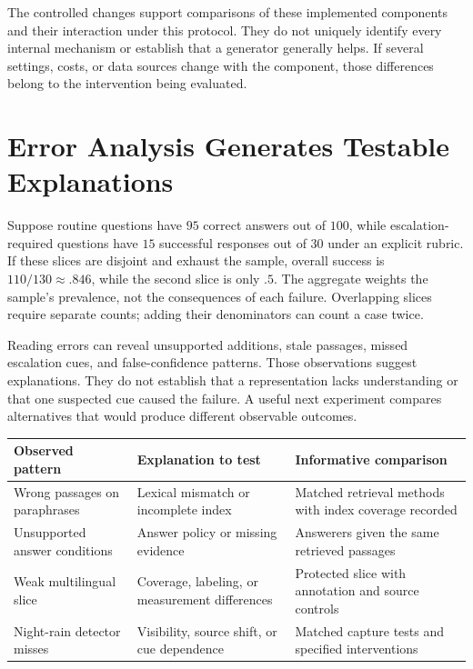 The controlled changes support comparisons of these implemented components and their interaction under this protocol. They do not uniquely identify every internal mechanism or establish that a generator generally helps. If several settings, costs, or data sources change with the component, those differences belong to the intervention being evaluated.

\section{Error Analysis Generates Testable Explanations}

Suppose routine questions have $95$ correct answers out of $100$, while escalation-required questions have $15$ successful responses out of $30$ under an explicit rubric. If these slices are disjoint and exhaust the sample, overall success is $110/130\approx.846$, while the second slice is only $.5$. The aggregate weights the sample's prevalence, not the consequences of each failure. Overlapping slices require separate counts; adding their denominators can count a case twice.

Reading errors can reveal unsupported additions, stale passages, missed escalation cues, and false-confidence patterns. Those observations suggest explanations. They do not establish that a representation lacks understanding or that one suspected cue caused the failure. A useful next experiment compares alternatives that would produce different observable outcomes.

\par\addvspace{\intextsep}\noindent\begin{minipage}{\linewidth}
\centering\small
\begin{tabular}{@{}L{3.0cm}L{3.2cm}L{3.5cm}@{}}
\toprule
Observed pattern & Explanation to test & Informative comparison \\
\midrule
Wrong passages on paraphrases & Lexical mismatch or incomplete index & Matched retrieval methods with index coverage recorded \\
Unsupported answer conditions & Answer policy or missing evidence & Answerers given the same retrieved passages \\
Weak multilingual slice & Coverage, labeling, or measurement differences & Protected slice with annotation and source controls \\
Night-rain detector misses & Visibility, source shift, or cue dependence & Matched capture tests and specified interventions \\
\bottomrule
\end{tabular}
\label{tab:error-cluster-next-experiment}
\end{minipage}\par\addvspace{\intextsep}

